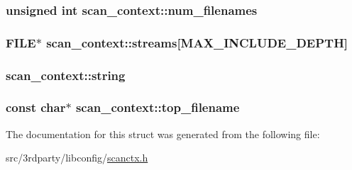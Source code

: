 \label{structscan__context_a2b37e18ccf435f4a0d302dd3e01c9b12}
\hypertarget{structscan__context_a62c81b43eb67d92788088d4835aa4d04}{
\subsubsection[{num\_\-filenames}]{\setlength{\rightskip}{0pt plus 5cm}unsigned int {\bf scan\_\-context::num\_\-filenames}}}
\label{structscan__context_a62c81b43eb67d92788088d4835aa4d04}
\hypertarget{structscan__context_a42b7e86466be147d557499f45d47cfb9}{
\subsubsection[{streams}]{\setlength{\rightskip}{0pt plus 5cm}FILE$\ast$ {\bf scan\_\-context::streams}\mbox{[}MAX\_\-INCLUDE\_\-DEPTH\mbox{]}}}
\label{structscan__context_a42b7e86466be147d557499f45d47cfb9}
\hypertarget{structscan__context_aa23d5c633b40966b509c91068b72fc47}{
\subsubsection[{string}]{ {\bf scan\_\-context::string}}}
\label{structscan__context_aa23d5c633b40966b509c91068b72fc47}
\hypertarget{structscan__context_ae3db7eaa46cd30631e3f154bdc514feb}{
\subsubsection[{top\_\-filename}]{\setlength{\rightskip}{0pt plus 5cm}const char$\ast$ {\bf scan\_\-context::top\_\-filename}}}
\label{structscan__context_ae3db7eaa46cd30631e3f154bdc514feb}


The documentation for this struct was generated from the following file:\begin{DoxyCompactItemize}
\item 
src/3rdparty/libconfig/\hyperlink{scanctx_8h}{scanctx.h}\end{DoxyCompactItemize}
